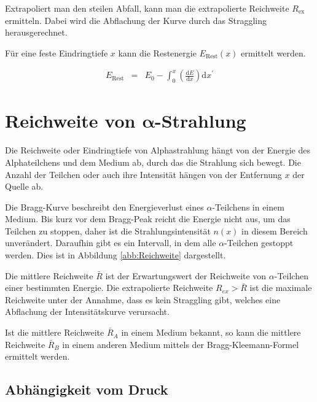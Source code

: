 \documentclass[12pt,a4paper]{scrartcl}
\numberwithin{equation}{section} %
\renewcommand{\[}{} %
\renewcommand{\]}{\noindent} %
\begin{document}
Extrapoliert man den steilen Abfall, kann man die extrapolierte
Reichweite $R_\mathrm{ex}$ ermitteln. Dabei wird die Abflachung der
Kurve durch das Straggling herausgerechnet.

Für eine feste Eindringtiefe $x$ kann die Restenergie
$E_\mathrm{Rest}(x)$ ermittelt werden.

\[
\begin{eqnarray}
        E_\mathrm{Rest}
                &=& E_0
                - \int_0^x \left(\frac{\mathrm dE}{\mathrm dx}\right) \mathrm dx^\prime
\end{eqnarray}
\]

\hypertarget{reichweite-von-pmbalpha-strahlung}{%
\section{\texorpdfstring{Reichweite von
$\pmb{\alpha}$-Strahlung}{Reichweite von \textbackslash pmb\{\textbackslash alpha\}-Strahlung}}\label{reichweite-von-pmbalpha-strahlung}}

Die Reichweite oder Eindringtiefe von Alphastrahlung hängt von der
Energie des Alphateilchens und dem Medium ab, durch das die Strahlung
sich bewegt. Die Anzahl der Teilchen oder auch ihre Intensität hängen
von der Entfernung $x$ der Quelle ab.

Die Bragg-Kurve beschreibt den Energieverlust eines $\alpha$-Teilchens
in einem Medium. Bis kurz vor dem Bragg-Peak reicht die Energie nicht
aus, um das Teilchen zu stoppen, daher ist die Strahlungsintensität
$n(x)$ in diesem Bereich unverändert. Daraufhin gibt es ein Intervall,
in dem alle $\alpha$-Teilchen gestoppt werden. Dies ist in Abbildung \ref{abb:Reichweite} dargestellt.

Die mittlere Reichweite $\bar R$ ist der Erwartungswert der Reichweite
von $\alpha$-Teilchen einer bestimmten Energie. Die extrapolierte
Reichweite $R_{ex}>\bar R$ ist die maximale Reichweite unter der
Annahme, dass es kein Straggling gibt, welches eine Abflachung der
Intensitätskurve verursacht.

Ist die mittlere Reichweite $\bar R_A$ in einem Medium bekannt, so
kann die mittlere Reichweite $\bar R_B$ in einem anderen Medium
mittels der Bragg-Kleemann-Formel ermittelt werden.

\hypertarget{abhuxe4ngigkeit-vom-druck}{%
\subsection{Abhängigkeit vom Druck}\label{abhuxe4ngigkeit-vom-druck}}
\end{document}
